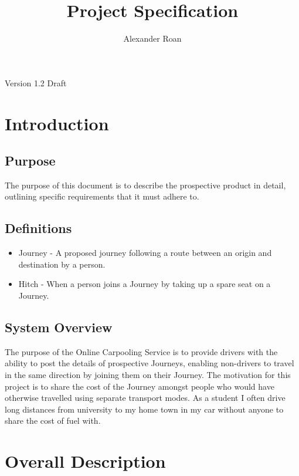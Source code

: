 \documentclass[11pt]{article}
\begin{document}
\begin{titlepage}
\title{Project Specification}
\author{Alexander Roan}
\maketitle
\begin{center}
Version 1.2 Draft
\end{center}
\end{titlepage}

\tableofcontents
\newpage
\section{Introduction}

\subsection{Purpose}
The purpose of this document is to describe the prospective product in detail, outlining specific requirements that it must adhere to.

\subsection{Definitions}
\begin{itemize}
\item Journey - A proposed journey following a route between an origin and destination by a person.
\item Hitch - When a person joins a Journey by taking up a spare seat on a Journey.
\end{itemize}

\subsection{System Overview}
The purpose of the Online Carpooling Service is to provide drivers with the ability to post the details of prospective Journeys, enabling non-drivers to travel in the same direction by joining them on their Journey. The motivation for this project is to share the cost of the Journey amongst people who would have otherwise travelled using separate transport modes. As a student I often drive long distances from university to my home town in my car without anyone to share the cost of fuel with.


\section{Overall Description}
\end{document}
